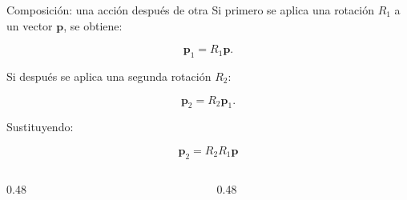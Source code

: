 \documentclass[aspectratio=169,10pt]{beamer}
\begin{document}
\begin{frame}{Composición: una acción después de otra}
    \small
    Si primero se aplica una rotación $R_1$ a un vector $\boldsymbol{p}$, se obtiene:

    \[
    \boldsymbol{p}_1=R_1\boldsymbol{p}.
    \]

    Si después se aplica una segunda rotación $R_2$:

    \[
    \boldsymbol{p}_2=R_2\boldsymbol{p}_1.
    \]

    Sustituyendo:

    \[
    \boxed{
    \boldsymbol{p}_2=R_2R_1\boldsymbol{p}}
    \]

    \begin{columns}[T]
        \begin{column}{0.48\textwidth}
        \end{column}
        \begin{column}{0.48\textwidth}
        \end{column}
    \end{columns}
\end{frame}
\end{document}
